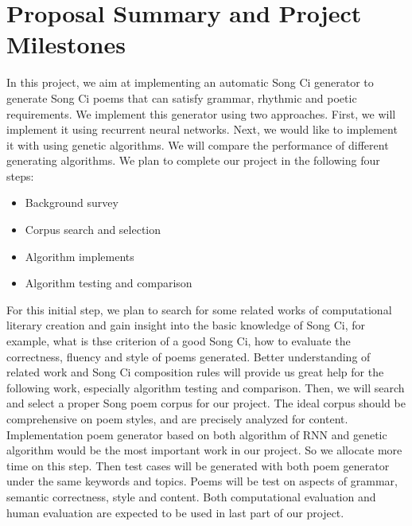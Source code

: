 \section{Proposal Summary and Project Milestones}
In this project, we aim at implementing an automatic Song Ci generator to generate Song Ci poems that can satisfy grammar, rhythmic and poetic requirements.
%
We implement this generator using two approaches. First, we will implement it using recurrent neural networks.
%
Next, we would like to implement it with using genetic algorithms.
%
We will compare the performance of different generating algorithms.
%
We plan to complete our project in the following four steps:

\begin{itemize}
\item Background survey
\item Corpus search and selection
\item Algorithm implements
\item Algorithm testing and comparison
\end{itemize}



For this initial step, we plan to search for some related works of computational literary creation and gain insight into the basic knowledge of Song Ci, for example, what is thse criterion of a good Song Ci, how to evaluate the correctness, fluency and style of poems generated. Better understanding of related work and Song Ci composition rules will provide us great help for the following work, especially algorithm testing and comparison. Then, we will search and select a proper Song poem corpus for our project. The ideal corpus should be comprehensive on poem styles, and are precisely analyzed for content. Implementation poem generator based on both algorithm of RNN and genetic algorithm would be the most important work in our project. So we allocate more time on this step. Then test cases will be generated with both poem generator under the same keywords and topics. Poems will be test on aspects of grammar, semantic correctness, style and content. Both computational evaluation and human evaluation are expected to be used in last part of our project.

